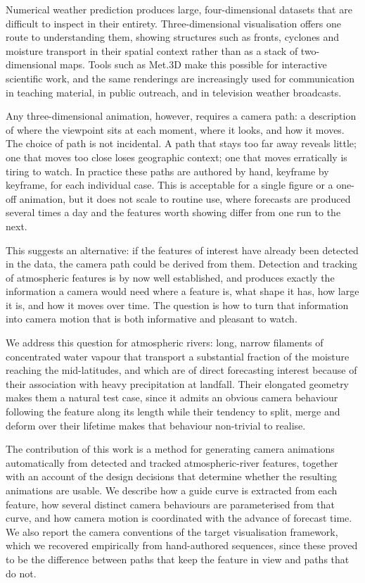 \documentclass[gmd, manuscript]{copernicus}
\begin{document}
Numerical weather prediction produces large, four-dimensional datasets
that are difficult to inspect in their entirety. Three-dimensional
visualisation offers one route to understanding them, showing structures
such as fronts, cyclones and moisture transport in their spatial context
rather than as a stack of two-dimensional maps. Tools such as Met.3D make
this possible for interactive scientific work, and the same renderings
are increasingly used for communication in teaching material, in
public outreach, and in television weather broadcasts.

Any three-dimensional animation, however, requires a camera path: a
description of where the viewpoint sits at each moment, where it looks,
and how it moves. The choice of path is not incidental. A path that stays
too far away reveals little; one that moves too close loses geographic
context; one that moves erratically is tiring to watch. In practice these
paths are authored by hand, keyframe by keyframe, for each individual
case. This is acceptable for a single figure or a one-off animation, but
it does not scale to routine use, where forecasts are produced several
times a day and the features worth showing differ from one run to the
next.

This suggests an alternative: if the features of interest have already
been detected in the data, the camera path could be derived from them.
Detection and tracking of atmospheric features is by now well
established, and produces exactly the information a camera would need
where a feature is, what shape it has, how large it is, and how it moves
over time. The question is how to turn that information into camera
motion that is both informative and pleasant to watch.

We address this question for atmospheric rivers: long, narrow filaments
of concentrated water vapour that transport a substantial fraction of the
moisture reaching the mid-latitudes, and which are of direct forecasting
interest because of their association with heavy precipitation at
landfall. Their elongated geometry makes them a natural test case, since
it admits an obvious camera behaviour following the feature along its
length while their tendency to split, merge and deform over their
lifetime makes that behaviour non-trivial to realise.

The contribution of this work is a method for generating camera
animations automatically from detected and tracked atmospheric-river
features, together with an account of the design decisions that determine
whether the resulting animations are usable. We describe how a guide
curve is extracted from each feature, how several distinct camera
behaviours are parameterised from that curve, and how camera motion is
coordinated with the advance of forecast time. We also report the camera
conventions of the target visualisation framework, which we recovered
empirically from hand-authored sequences, since these proved to be the
difference between paths that keep the feature in view and paths that do
not.
\end{document}
